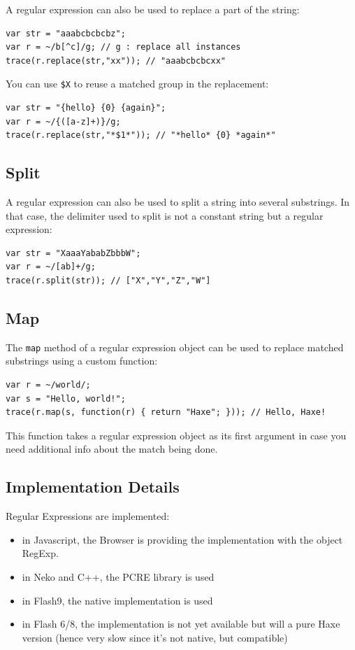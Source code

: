 \documentclass[a4paper,oneside]{book}
\newcommand{\expr}[1]{\texttt{#1}}
\begin{document}
A regular expression can also be used to replace a part of the string:

\begin{lstlisting}
var str = "aaabcbcbcbz";
var r = ~/b[^c]/g; // g : replace all instances
trace(r.replace(str,"xx")); // "aaabcbcbcxx"
\end{lstlisting}

You can use \expr{\$X} to reuse a matched group in the replacement:

\begin{lstlisting}
var str = "{hello} {0} {again}";
var r = ~/{([a-z]+)}/g;
trace(r.replace(str,"*$1*")); // "*hello* {0} *again*"
\end{lstlisting}

\subsection{Split}
A regular expression can also be used to split a string into several substrings. In that case, the delimiter used to split is not a constant string but a regular expression:

\begin{lstlisting}
var str = "XaaaYababZbbbW";
var r = ~/[ab]+/g;
trace(r.split(str)); // ["X","Y","Z","W"]
\end{lstlisting}

\subsection{Map}
The \expr{map} method of a regular expression object can be used to replace matched substrings using a custom function:

\begin{lstlisting}
var r = ~/world/;
var s = "Hello, world!";
trace(r.map(s, function(r) { return "Haxe"; })); // Hello, Haxe!
\end{lstlisting}

This function takes a regular expression object as its first argument in case you
need additional info about the match being done.

\subsection{Implementation Details}

Regular Expressions are implemented:
\begin{itemize}
    \item in Javascript, the Browser is providing the implementation with the object RegExp.
    \item in Neko and C++, the PCRE library is used
    \item in Flash9, the native implementation is used
    \item {} in Flash 6/8, the implementation is not yet available but will a pure Haxe version (hence very slow since it's not native, but compatible)
\end{itemize}
\end{document}
